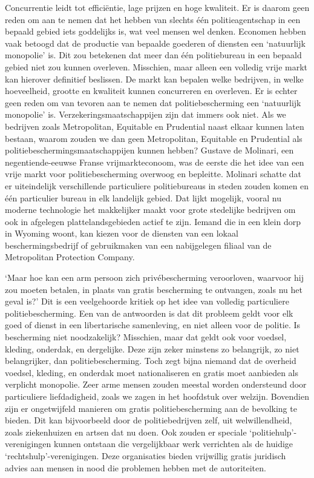 \documentclass[
  a5paper,
  smalldemyvopaper,10pt,twoside,onecolumn,openright,extrafontsizes,hidelinks]{memoir}
\begin{document}
Concurrentie leidt tot efficiëntie, lage prijzen en hoge kwaliteit. Er
is daarom geen reden om aan te nemen dat het hebben van slechts één
politieagentschap in een bepaald gebied iets goddelijks is, wat veel
mensen wel denken. Economen hebben vaak betoogd dat de productie van
bepaalde goederen of diensten een `natuurlijk monopolie' is. Dit zou
betekenen dat meer dan één politiebureau in een bepaald gebied niet zou
kunnen overleven. Misschien, maar alleen een volledig vrije markt kan
hierover definitief beslissen. De markt kan bepalen welke bedrijven, in
welke hoeveelheid, grootte en kwaliteit kunnen concurreren en overleven.
Er is echter geen reden om van tevoren aan te nemen dat
politiebescherming een `natuurlijk monopolie' is.
Verzekeringsmaatschappijen zijn dat immers ook niet. Als we bedrijven
zoals Metropolitan, Equitable en Prudential naast elkaar kunnen laten
bestaan, waarom zouden we dan geen Metropolitan, Equitable en Prudential
als politiebeschermingsmaatschappijen kunnen hebben? Gustave de
Molinari, een negentiende-eeuwse Franse vrijmarkteconoom, was de eerste
die het idee van een vrije markt voor politiebescherming overwoog en
bepleitte. Molinari schatte dat er uiteindelijk verschillende
particuliere politiebureaus in steden zouden komen en één particulier
bureau in elk landelijk gebied. Dat lijkt mogelijk, vooral nu moderne
technologie het makkelijker maakt voor grote stedelijke bedrijven om ook
in afgelegen plattelandsgebieden actief te zijn. Iemand die in een klein
dorp in Wyoming woont, kan kiezen voor de diensten van een lokaal
beschermingsbedrijf of gebruikmaken van een nabijgelegen filiaal van de
Metropolitan Protection Company.

`Maar hoe kan een arm persoon zich privébescherming veroorloven,
waarvoor hij zou moeten betalen, in plaats van gratis bescherming te
ontvangen, zoals nu het geval is?' Dit is een veelgehoorde kritiek op
het idee van volledig particuliere politiebescherming. Een van de
antwoorden is dat dit probleem geldt voor elk goed of dienst in een
libertarische samenleving, en niet alleen voor de politie. Is
bescherming niet noodzakelijk? Misschien, maar dat geldt ook voor
voedsel, kleding, onderdak, en dergelijke. Deze zijn zeker minstens zo
belangrijk, zo niet belangrijker, dan politiebescherming. Toch zegt
bijna niemand dat de overheid voedsel, kleding, en onderdak moet
nationaliseren en gratis moet aanbieden als verplicht monopolie. Zeer
arme mensen zouden meestal worden ondersteund door particuliere
liefdadigheid, zoals we zagen in het hoofdstuk over welzijn. Bovendien
zijn er ongetwijfeld manieren om gratis politiebescherming aan de
bevolking te bieden. Dit kan bijvoorbeeld door de politiebedrijven zelf,
uit welwillendheid, zoals ziekenhuizen en artsen dat nu doen. Ook zouden
er speciale `politiehulp'-verenigingen kunnen ontstaan die vergelijkbaar
werk verrichten als de huidige `rechtshulp'-verenigingen. Deze
organisaties bieden vrijwillig gratis juridisch advies aan mensen in
nood die problemen hebben met de autoriteiten.
\end{document}
